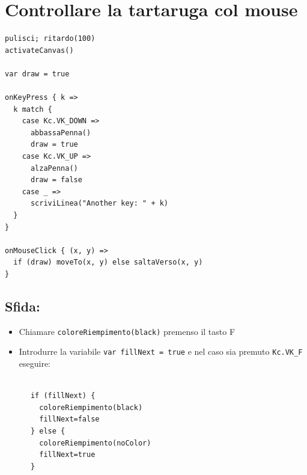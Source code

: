\chapter{Controllare la tartaruga col mouse}
\begin{multicols}{2}

\begin{lstlisting}[basicstyle={\ttfamily\fontsize{16}{19}\selectfont},numbers=none]
pulisci; ritardo(100)
activateCanvas()

var draw = true

onKeyPress { k =>
  k match {
    case Kc.VK_DOWN => 
      abbassaPenna()
      draw = true
    case Kc.VK_UP => 
      alzaPenna()
      draw = false
    case _ => 
      scriviLinea("Another key: " + k)
  }
}

onMouseClick { (x, y) =>
  if (draw) moveTo(x, y) else saltaVerso(x, y)
}
\end{lstlisting}
        


\columnbreak


\section*{\color{BrickRed}Sfida:}


\begin{itemize}

\item {Chiamare \lstinline{coloreRiempimento(black)} premenso il tasto F}
\item {Introdurre la variabile \lstinline{var fillNext = true} e nel caso sia premuto \lstinline{Kc.VK_F} eseguire:}

\end{itemize}



\begin{lstlisting}[numbers=none]

      if (fillNext) {
        coloreRiempimento(black)
        fillNext=false
      } else {
        coloreRiempimento(noColor)
        fillNext=true
      }
      
\end{lstlisting}
        
\end{multicols}


